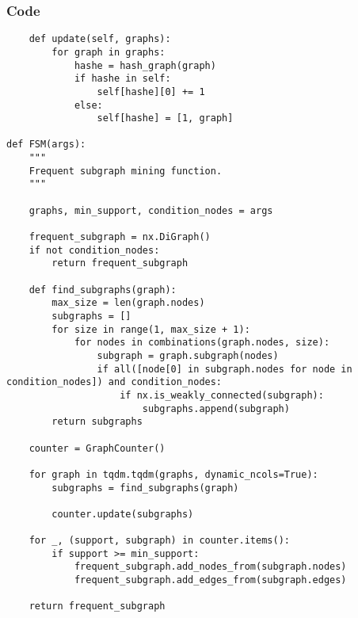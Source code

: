\documentclass{beamer}
\begin{document}
\begin{frame}[fragile]
    \frametitle{Code}
    \fontsize{3pt}{5pt}\selectfont
    \begin{verbatim}
    def update(self, graphs):
        for graph in graphs:
            hashe = hash_graph(graph)
            if hashe in self:
                self[hashe][0] += 1
            else:
                self[hashe] = [1, graph]

def FSM(args):
    """
    Frequent subgraph mining function.
    """
    
    graphs, min_support, condition_nodes = args
    
    frequent_subgraph = nx.DiGraph()
    if not condition_nodes:
        return frequent_subgraph
    
    def find_subgraphs(graph):
        max_size = len(graph.nodes)
        subgraphs = []
        for size in range(1, max_size + 1):
            for nodes in combinations(graph.nodes, size):
                subgraph = graph.subgraph(nodes)
                if all([node[0] in subgraph.nodes for node in condition_nodes]) and condition_nodes:
                    if nx.is_weakly_connected(subgraph):
                        subgraphs.append(subgraph)
        return subgraphs

    counter = GraphCounter()

    for graph in tqdm.tqdm(graphs, dynamic_ncols=True):
        subgraphs = find_subgraphs(graph)

        counter.update(subgraphs)

    for _, (support, subgraph) in counter.items():
        if support >= min_support:
            frequent_subgraph.add_nodes_from(subgraph.nodes)
            frequent_subgraph.add_edges_from(subgraph.edges)
    
    return frequent_subgraph
    \end{verbatim}
\end{frame}
\end{document}

